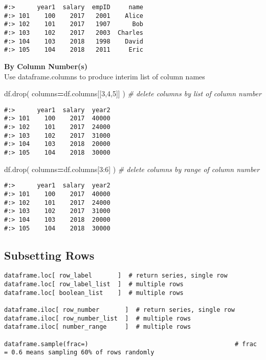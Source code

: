\documentclass[
]{book}
\newenvironment{Shaded}{\begin{snugshade}}{\end{snugshade}}
\newcommand{\CommentTok}[1]{\textcolor[rgb]{0.37,0.37,0.37}{\textit{#1}}}
\newcommand{\DecValTok}[1]{\textcolor[rgb]{0.06,0.06,0.06}{#1}}
\newcommand{\NormalTok}[1]{#1}
\newcommand{\OperatorTok}[1]{\textcolor[rgb]{0.43,0.43,0.43}{\textbf{#1}}}
\begin{document}
\begin{verbatim}
#:>      year1  salary  empID     name
#:> 101    100    2017   2001    Alice
#:> 102    101    2017   1907      Bob
#:> 103    102    2017   2003  Charles
#:> 104    103    2018   1998    David
#:> 105    104    2018   2011     Eric
\end{verbatim}

\textbf{By Column Number(s)}\\
Use dataframe.columns to produce interim list of column names

\begin{Shaded}
\begin{Highlighting}[]
\NormalTok{df.drop( columns}\OperatorTok{=}\NormalTok{df.columns[[}\DecValTok{3}\NormalTok{,}\DecValTok{4}\NormalTok{,}\DecValTok{5}\NormalTok{]] )   }\CommentTok{\# delete columns by list of column number}
\end{Highlighting}
\end{Shaded}

\begin{verbatim}
#:>      year1  salary  year2
#:> 101    100    2017  40000
#:> 102    101    2017  24000
#:> 103    102    2017  31000
#:> 104    103    2018  20000
#:> 105    104    2018  30000
\end{verbatim}

\begin{Shaded}
\begin{Highlighting}[]
\NormalTok{df.drop( columns}\OperatorTok{=}\NormalTok{df.columns[}\DecValTok{3}\NormalTok{:}\DecValTok{6}\NormalTok{] )       }\CommentTok{\# delete columns by range of column number}
\end{Highlighting}
\end{Shaded}

\begin{verbatim}
#:>      year1  salary  year2
#:> 101    100    2017  40000
#:> 102    101    2017  24000
#:> 103    102    2017  31000
#:> 104    103    2018  20000
#:> 105    104    2018  30000
\end{verbatim}

\hypertarget{subsetting-rows}{%
\subsection{Subsetting Rows}\label{subsetting-rows}}

\begin{verbatim}
dataframe.loc[ row_label       ]  # return series, single row
dataframe.loc[ row_label_list  ]  # multiple rows
dataframe.loc[ boolean_list    ]  # multiple rows

dataframe.iloc[ row_number       ]  # return series, single row
dataframe.iloc[ row_number_list  ]  # multiple rows
dataframe.iloc[ number_range     ]  # multiple rows

dataframe.sample(frac=)                                        # frac = 0.6 means sampling 60% of rows randomly
\end{verbatim}
\end{document}
